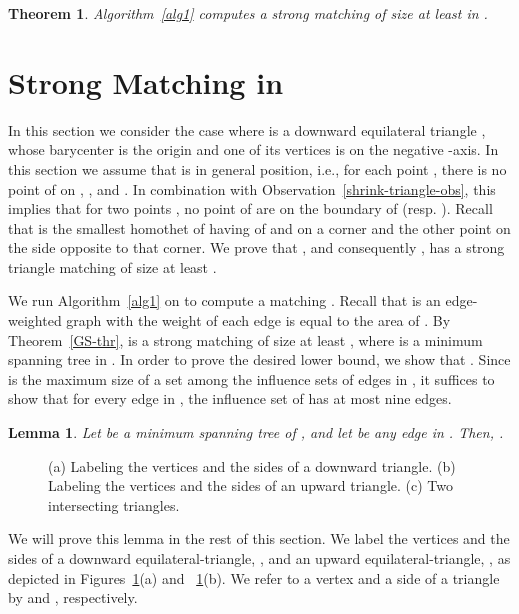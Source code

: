 \documentclass[11pt,a4paper]{article}
\newtheorem{lemma}{Lemma}
\newtheorem{theorem}{Theorem}
\begin{document}
\begin{theorem}
 \label{Gabriel-thr}
Algorithm~\ref{alg1} computes a strong matching of size at least  in .
\end{theorem}


\section{Strong Matching in }
\label{half-theta-six-section}
In this section we consider the case where  is a downward equilateral triangle , whose barycenter is the origin and one of its vertices is on the negative -axis. In this section we assume that  is in general position, i.e., for each point , there is no point of  on , , and . In combination with Observation~\ref{shrink-triangle-obs}, this implies that for two points , no point of  are on the boundary of  (resp. ). Recall that  is the smallest homothet of  having of  and  on a corner and the other point on the side opposite to that corner. We prove that , and consequently , has a strong triangle matching of size at least . 

We run Algorithm~\ref{alg1} on  to compute a matching . Recall that  is an edge-weighted graph with the weight of each edge  is equal to the area of . By Theorem~\ref{GS-thr},  is a strong matching of size at least , where  is a minimum spanning tree in . In order to prove the desired lower bound, we show that . Since  is the maximum size of a set among the
influence sets of edges in , it suffices to show that for every edge  in , the influence set of  has at most nine edges. 
\begin{lemma}
\label{triangle-inf-lemma}
Let  be a minimum spanning tree of , and let  be any edge in . Then, .
\end{lemma}
  

 \begin{figure}[htb]
  \centering
\setlength{\tabcolsep}{0in}
  
  \caption{(a) Labeling the vertices and the sides of a downward triangle. (b) Labeling the vertices and the sides of an upward triangle. (c) Two intersecting triangles.}
  \label{triangle-fig}
\end{figure}

We will prove this lemma in the rest of this section. We label the vertices and the sides of a downward equilateral-triangle, , and an upward equilateral-triangle, , as depicted in Figures~\ref{triangle-fig}(a) and ~\ref{triangle-fig}(b). We refer to a vertex  and a side  of a triangle  by  and , respectively.
\end{document}
